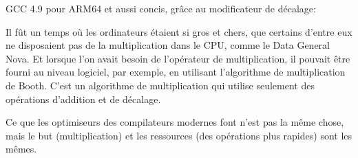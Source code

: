 









GCC 4.9 pour ARM64 et aussi concis, grâce au modificateur de décalage:




Il fût un temps où les ordinateurs étaient si gros et chers, que certains d'entre
eux ne disposaient pas de la multiplication dans le \ac{CPU}, comme le Data General Nova.
Et lorsque l'on avait besoin de l'opérateur de multiplication, il pouvait être fourni
au niveau logiciel, par exemple, en utilisant l'algorithme de multiplication de Booth.
C'est un algorithme de multiplication qui utilise seulement des opérations d'addition
et de décalage.

Ce que les optimiseurs des compilateurs modernes font n'est pas la même chose, mais
le but (multiplication) et les ressources (des opérations plus rapides) sont les mêmes.
